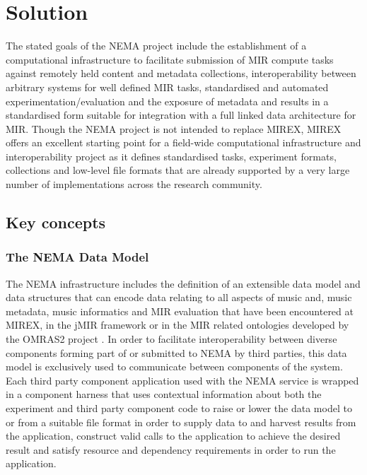 \documentclass[conference]{IEEEtran}
\begin{document}
\section{Solution}
The stated goals of the NEMA project include the establishment of a computational infrastructure to facilitate submission of MIR compute tasks against remotely held content and metadata collections, interoperability between arbitrary systems for well defined MIR tasks, standardised and automated experimentation/evaluation and the exposure of metadata and results in a standardised form suitable for integration with a full linked data architecture for MIR. 
Though the NEMA project is not intended to replace MIREX, MIREX offers an excellent starting point for a field-wide computational infrastructure and interoperability project as it defines standardised tasks, experiment formats, collections and low-level file formats that are already supported by a very large number of implementations across the research community. 

\subsection{Key concepts}
\subsubsection{The NEMA Data Model}
The NEMA infrastructure includes the definition of an extensible data model and data structures that can encode data relating to all aspects of music and, music metadata, music informatics and MIR evaluation that have been encountered at MIREX, in the jMIR framework \cite{mckay2009jmir} or in the MIR related ontologies developed by the OMRAS2 project \cite{raimond2007music}. In order to facilitate interoperability between diverse components forming part of or submitted to NEMA by third parties, this data model is exclusively used to communicate between components of the system. 
Each third party component application used with the NEMA service is wrapped in a component harness that uses contextual information about both the experiment and third party component code to raise or lower the data model to or from a suitable file format in order to supply data to and harvest results from the application, construct valid calls to the application to achieve the desired result and satisfy resource and dependency requirements in order to run the application.  
\end{document}
